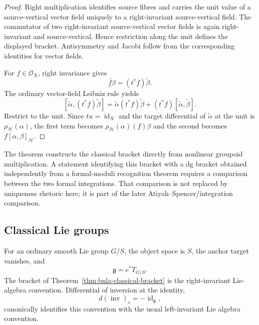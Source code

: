 \begin{proof}
Right multiplication identifies source fibres and carries the unit value of a
source-vertical vector field uniquely to a right-invariant source-vertical
field.  The commutator of two right-invariant source-vertical vector fields is
again right-invariant and source-vertical.  Hence restriction along the unit
defines the displayed bracket.  Antisymmetry and Jacobi follow from the
corresponding identities for vector fields.

For $f\in\mathcal O_X$, right invariance gives
\[
    \widetilde{f\beta}
    =
    (t^*f)\widetilde\beta.
\]
The ordinary vector-field Leibniz rule yields
\[
    [\widetilde\alpha,(t^*f)\widetilde\beta]
    =
    \widetilde\alpha(t^*f)\widetilde\beta
    +(t^*f)
    [\widetilde\alpha,\widetilde\beta].
\]
Restrict to the unit.  Since $tu=\operatorname{id}_X$ and the target
differential of $\widetilde\alpha$ at the unit is
$\rho_{\mathcal H}(\alpha)$, the first term becomes
$\rho_{\mathcal H}(\alpha)(f)\beta$ and the second becomes
$f[\alpha,\beta]_{\mathcal H}$.
\end{proof}

\begin{remark}
The theorem constructs the classical bracket directly from nonlinear groupoid
multiplication.  A statement identifying this bracket with a dg bracket
obtained independently from a formal-moduli recognition theorem requires a
comparison between the two formal integrations.  That comparison is not
replaced by uniqueness rhetoric here; it is part of the later
Atiyah--Spencer/integration comparison.
\end{remark}

\subsection{Classical Lie groups}

\begin{corollary}
\label{cor:bnla-classical-lie-algebra}
For an ordinary smooth Lie group $G/S$, the object space is $S$, the anchor
target vanishes, and
\[
    \mathfrak g
    =
    e^*T_{G/S}.
\]
The bracket of
Theorem~\ref{thm:bnla-classical-bracket} is the right-invariant Lie-algebra
convention.  Differential of inversion at the identity,
\[
    d(\operatorname{inv})_e=-\operatorname{id}_{\mathfrak g},
\]
canonically identifies this convention with the usual left-invariant Lie
algebra convention.
\end{corollary}

